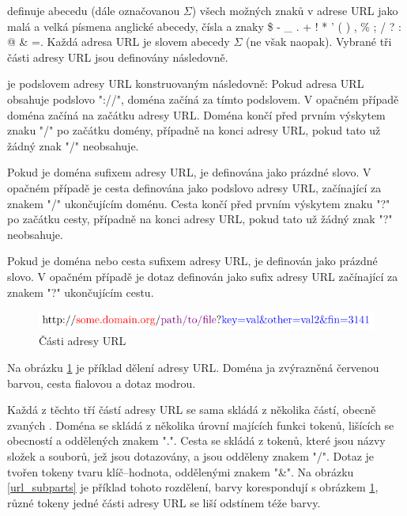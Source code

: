 \cite{berners-lee_uniform_1994} definuje abecedu (dále označovanou \( \Sigma \)) všech možných znaků v adrese URL jako malá a velká písmena anglické abecedy, čísla a znaky \$ - \_ . + ! * ' ( ) , \% ; / ? : @ \& =. Každá adresa URL je slovem abecedy \( \Sigma \) (ne však naopak). Vybrané tři části adresy URL jsou definovány následovně.
\begin{define}
	 je podslovem adresy URL konstruovaným následovně: Pokud adresa URL obsahuje podslovo "://", doména začíná za tímto podslovem. V opačném případě doména začíná na začátku adresy URL. Doména končí před prvním výskytem znaku "/" po začátku domény, případně na konci adresy URL, pokud tato už žádný znak "/" neobsahuje.
\end{define}
\begin{define}
	Pokud je doména sufixem adresy URL, je  definována jako prázdné slovo. V opačném případě je cesta definována jako podslovo adresy URL, začínající za znakem "/" ukončujícím doménu. Cesta končí před prvním výskytem znaku "?" po začátku cesty, případně na konci adresy URL, pokud tato už žádný znak "?" neobsahuje.
\end{define}
\begin{define}
	Pokud je doména nebo cesta sufixem adresy URL, je  definován jako prázdné slovo. V opačném případě je dotaz definován jako sufix adresy URL začínající za znakem "?" ukončujícím cestu.
\end{define}

\begin{figure}[h]
	\centering
	\includegraphics{images/url_parts/url_parts.pdf}
	\caption{Části adresy URL}\label{url_parts}
\end{figure}

Na obrázku \ref{url_parts} je příklad dělení adresy URL. Doména ja zvýrazněná červenou barvou, cesta fialovou a dotaz modrou.

Každá z těchto tří částí adresy URL se sama skládá z několika částí, obecně zvaných . Doména se skládá z několika úrovní majících funkci tokenů, lišících se obecností a oddělených znakem ".". Cesta se skládá z tokenů, které jsou názvy složek a souborů, jež jsou dotazovány, a jsou odděleny znakem "/". Dotaz je tvořen tokeny tvaru klíč--hodnota, oddělenými znakem "\&". Na obrázku \ref{url_subparts} je příklad tohoto rozdělení, barvy korespondují s obrázkem \ref{url_parts}, různé tokeny jedné části adresy URL se liší odstínem téže barvy.

